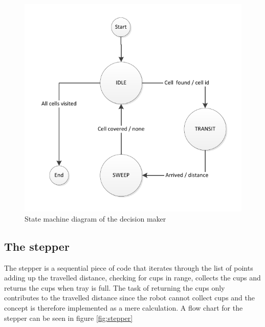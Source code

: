 \begin{figure}[htb]
	\centering
	\includegraphics[width=\textwidth,trim=0 0 0 0]{graphics/decisionmaker.pdf}
	\caption{State machine diagram of the decision maker}
	\label{fig:decisionmaker}			
\end{figure}

\subsection{The stepper}
The stepper is a sequential piece of code that iterates through the list of
points adding up the travelled distance, checking for cups in range, collects
the cups and returns the cups when tray is full. The task of returning the cups
only contributes to the travelled distance since the robot cannot collect cups
and the concept is therefore implemented as a mere calculation. A flow chart for the stepper can be seen in
figure
\ref{fig:stepper}

